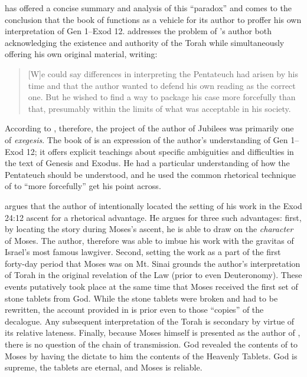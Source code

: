 \vanderkam has offered a concise summary and analysis of this ``\psgraphical paradox'' and comes to the conclusion that the book of \jub functions as a vehicle for its author to proffer his own interpretation of Gen 1--Exod 12. \vanderkam addresses the problem of \jub's author both acknowledging the existence and authority of the Torah while simultaneously offering his own original material, writing:

\begin{quote}
    [W]e could say differences in interpreting the Pentateuch had arisen by his time and that the author wanted to defend his own reading as the correct one. But he wished to find a way to package his case more forcefully than that, presumably within the limits of what was acceptable in his society.\autocite[28]{vanderkam_metso-etal2010}
\end{quote}

According to \vanderkam, therefore, the project of the author of Jubilees was primarily one of \emph{exegesis}. The book of \jub is an expression of the author's understanding of Gen 1--Exod 12; it offers explicit teachings about specific ambiguities and difficulties in the text of Genesis and Exodus. He had a particular understanding of how the Pentateuch should be understood, and he used the common rhetorical technique of \psy to ``more forcefully'' get his point across.%
    \autocite[28]{vanderkam_metso-etal2010}

\vanderkam argues that the author of \jub intentionally located the setting of his work in the Exod 24:12 ascent for a rhetorical advantage. He argues for three such advantages: first, by locating the story during Moses's ascent, he is able to draw on the \emph{character} of Moses. The author, therefore was able to imbue his work with the gravitas of Israel's most famous lawgiver. Second, setting the work as a part of the first forty-day period that Moses was on Mt. Sinai grounds the author's interpretation of Torah in the original revelation of the Law (prior to even Deuteronomy). These events putatively took place at the same time that Moses received the first set of stone tablets from God. While the stone tablets were broken and had to be rewritten, the account provided in \jub is prior even to those ``copies'' of the decalogue. Any subsequent interpretation of the Torah is secondary by virtue of its relative lateness. Finally, because Moses himself is presented as the author of \jub, there is no question of the chain of transmission. God revealed the contents of \jub to Moses by having the \ap dictate to him the contents of the Heavenly Tablets. God is supreme, the tablets are eternal, and Moses is reliable.


